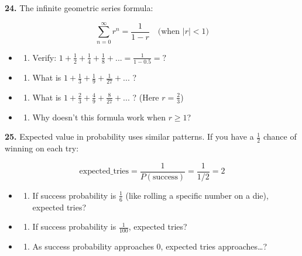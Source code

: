 \documentclass[
  11pt,
]{article}
\providecommand{\tightlist}{%
  \setlength{\itemsep}{0pt}\setlength{\parskip}{0pt}}
\begin{document}
\textbf{24.} The infinite geometric series formula:

\[\sum_{n=0}^{\infty} r^n = \dfrac{1}{1-r} \quad \text{(when } |r| < 1 \text{)}\]

\begin{itemize}
\item
  \begin{enumerate}
  \def\labelenumi{(\alph{enumi})}
  \tightlist
  \item
    Verify:
    \(1 + \frac{1}{2} + \frac{1}{4} + \frac{1}{8} + ... = \frac{1}{1 - 0.5} = ?\)
  \end{enumerate}
\item
  \begin{enumerate}
  \def\labelenumi{(\alph{enumi})}
  \setcounter{enumi}{1}
  \tightlist
  \item
    What is \(1 + \frac{1}{3} + \frac{1}{9} + \frac{1}{27} + ...\) ?
  \end{enumerate}
\item
  \begin{enumerate}
  \def\labelenumi{(\alph{enumi})}
  \setcounter{enumi}{2}
  \tightlist
  \item
    What is \(1 + \frac{2}{3} + \frac{4}{9} + \frac{8}{27} + ...\) ?
    (Here \(r = \frac{2}{3}\))
  \end{enumerate}
\item
  \begin{enumerate}
  \def\labelenumi{(\alph{enumi})}
  \setcounter{enumi}{3}
  \tightlist
  \item
    Why doesn't this formula work when \(r \geq 1\)?
  \end{enumerate}
\end{itemize}

\textbf{25.} Expected value in probability uses similar patterns. If you
have a \(\frac{1}{2}\) chance of winning on each try:

\[\text{expected\_tries} = \dfrac{1}{P(\text{success})} = \dfrac{1}{1/2} = 2\]

\begin{itemize}
\item
  \begin{enumerate}
  \def\labelenumi{(\alph{enumi})}
  \tightlist
  \item
    If success probability is \(\frac{1}{6}\) (like rolling a specific
    number on a die), expected tries?
  \end{enumerate}
\item
  \begin{enumerate}
  \def\labelenumi{(\alph{enumi})}
  \setcounter{enumi}{1}
  \tightlist
  \item
    If success probability is \(\frac{1}{100}\), expected tries?
  \end{enumerate}
\item
  \begin{enumerate}
  \def\labelenumi{(\alph{enumi})}
  \setcounter{enumi}{2}
  \tightlist
  \item
    As success probability approaches 0, expected tries
    approaches\ldots?
  \end{enumerate}
\end{itemize}
\end{document}
